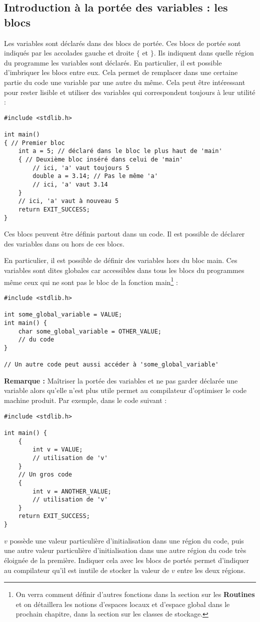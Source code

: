 \documentclass[../../../main.tex]{subfiles}
\begin{document}
\subsection{Introduction à la portée des variables : les blocs}
Les variables sont déclarés dans des blocs de portée. Ces blocs de portée sont indiqués par les accolades gauche et droite $\{$ et $\}$. Ils indiquent dans quelle région du programme les variables sont déclarés. En particulier, il est possible d'imbriquer les blocs entre eux. Cela permet de remplacer dans une certaine partie du code une variable par une autre du même. Cela peut être intéressant pour rester lisible et utiliser des variables qui correspondent toujours à leur utilité :
\begin{verbatim}
#include <stdlib.h>

int main()
{ // Premier bloc
	int a = 5; // déclaré dans le bloc le plus haut de 'main'
	{ // Deuxième bloc inséré dans celui de 'main'
		// ici, 'a' vaut toujours 5
		double a = 3.14; // Pas le même 'a'
		// ici, 'a' vaut 3.14
	}
	// ici, 'a' vaut à nouveau 5
	return EXIT_SUCCESS;
}
\end{verbatim}
Ces blocs peuvent être définis partout dans un code. Il est possible de déclarer des variables dans ou hors de ces blocs.
 
En particulier, il est possible de définir des variables hors du bloc \textsf{main}. Ces variables sont dites globales car accessibles dans tous les blocs du programmes même ceux qui ne sont pas le bloc de la fonction \textsf{main}\footnote{On verra comment définir d'autres fonctions dans la section sur les \textbf{Routines} et on détaillera les notions d'espaces locaux et d'espace global dans le prochain chapitre, dans la section sur les classes de stockage.} :
\begin{verbatim}
#include <stdlib.h>

int some_global_variable = VALUE;
int main() {
	char some_global_variable = OTHER_VALUE;
	// du code
}

// Un autre code peut aussi accéder à 'some_global_variable'
\end{verbatim}
\textbf{Remarque :} Maîtriser la portée des variables et ne pas garder déclarée une variable alors qu'elle n'est plus utile permet au compilateur d'optimiser le code machine produit. Par exemple, dans le code suivant :
\begin{verbatim}
#include <stdlib.h>

int main() {
	{
		int v = VALUE;
		// utilisation de 'v'
	}
	// Un gros code
	{
		int v = ANOTHER_VALUE;
		// utilisation de 'v'
	}
	return EXIT_SUCCESS;
}
\end{verbatim}
$v$ possède une valeur particulière d'initialisation dans une région du code, puis une autre valeur particulière d'initialisation dans une autre région du code très éloignée de la première. Indiquer cela avec les blocs de portés permet d'indiquer au compilateur qu'il est inutile de stocker la valeur de $v$ entre les deux régions.
\end{document}
